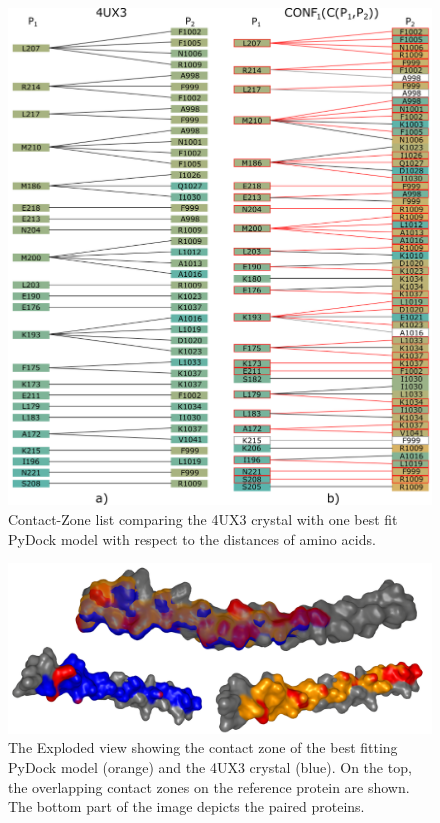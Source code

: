 \documentclass[twocolumn]{bmcart}%
\def\ExpView {Exploded view\xspace}
\def\CoZoList{Contact-Zone list\xspace}
\begin{document}
\begin{figure}[!h]
    \centering
  \includegraphics[width=0.9\columnwidth]{images/figure13.pdf}
	\vspace{-5pt}
    \caption{ \CoZoList comparing the 4UX3 crystal with one best fit PyDock model with respect to the distances of amino acids.}
  \label{fig:coiled2}    
\end{figure}

\begin{figure}[!hb]
  \centering
  \includegraphics[width=0.84\columnwidth]{images/figure14.png}
  \vspace{-5pt}
  \caption{ The \ExpView showing the contact zone of the best fitting PyDock model (orange) and the 4UX3 crystal (blue). On the top, the overlapping contact zones on the reference protein are shown. The bottom part of the image depicts the paired proteins.}
  \label{fig:selection_4_final_SMC3_PyDock}
  \end{figure}
\end{document}

